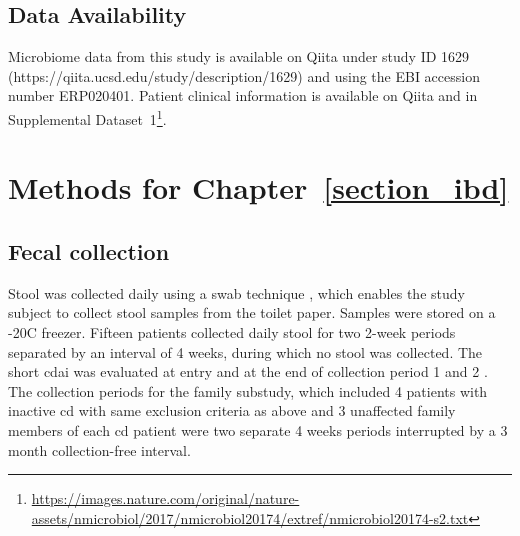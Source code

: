 \subsection{Data Availability}

Microbiome data from this study is available on Qiita under study ID 1629 
(https://qiita.ucsd.edu/study/description/1629) and using the EBI accession 
number ERP020401. Patient clinical information is available on Qiita and in 
Supplemental 
Dataset~1\footnote{\url{https://images.nature.com/original/nature-assets/nmicrobiol/2017/nmicrobiol20174/extref/nmicrobiol20174-s2.txt}}. 

\section{Methods for Chapter~\ref{section_ibd}}\label{appendix_ibd}

\subsection{Fecal collection}

Stool was collected daily using a swab technique \cite{RN4220}, which enables 
the study subject to collect stool samples from the toilet paper. Samples were 
stored on a -20\textdegree C freezer. Fifteen patients collected daily stool 
for two 2-week periods separated by an interval of 4 weeks, during which no 
stool was collected.  The short \gls{cdai} was evaluated at entry and at 
the end of collection period 1 and 2 \cite{RN4006}. The collection periods 
for the family substudy, which included 4 patients with inactive \gls{cd} 
with same exclusion criteria as above and 3 unaffected family members of 
each \gls{cd} patient were two separate 4 weeks periods interrupted by a 3 
month collection-free interval.

